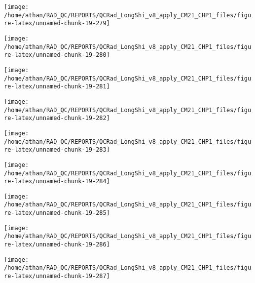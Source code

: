 \documentclass[
  10pt,
  a4paper,oneside]{article}
\begin{document}
\begin{center}\texttt{[image: /home/athan/RAD\_QC/REPORTS/QCRad\_LongShi\_v8\_apply\_CM21\_CHP1\_files/figure-latex/unnamed-chunk-19-279]} \end{center}

\begin{center}\texttt{[image: /home/athan/RAD\_QC/REPORTS/QCRad\_LongShi\_v8\_apply\_CM21\_CHP1\_files/figure-latex/unnamed-chunk-19-280]} \end{center}

\begin{center}\texttt{[image: /home/athan/RAD\_QC/REPORTS/QCRad\_LongShi\_v8\_apply\_CM21\_CHP1\_files/figure-latex/unnamed-chunk-19-281]} \end{center}

\begin{center}\texttt{[image: /home/athan/RAD\_QC/REPORTS/QCRad\_LongShi\_v8\_apply\_CM21\_CHP1\_files/figure-latex/unnamed-chunk-19-282]} \end{center}

\begin{center}\texttt{[image: /home/athan/RAD\_QC/REPORTS/QCRad\_LongShi\_v8\_apply\_CM21\_CHP1\_files/figure-latex/unnamed-chunk-19-283]} \end{center}

\begin{center}\texttt{[image: /home/athan/RAD\_QC/REPORTS/QCRad\_LongShi\_v8\_apply\_CM21\_CHP1\_files/figure-latex/unnamed-chunk-19-284]} \end{center}

\begin{center}\texttt{[image: /home/athan/RAD\_QC/REPORTS/QCRad\_LongShi\_v8\_apply\_CM21\_CHP1\_files/figure-latex/unnamed-chunk-19-285]} \end{center}

\begin{center}\texttt{[image: /home/athan/RAD\_QC/REPORTS/QCRad\_LongShi\_v8\_apply\_CM21\_CHP1\_files/figure-latex/unnamed-chunk-19-286]} \end{center}

\begin{center}\texttt{[image: /home/athan/RAD\_QC/REPORTS/QCRad\_LongShi\_v8\_apply\_CM21\_CHP1\_files/figure-latex/unnamed-chunk-19-287]} \end{center}
\end{document}
